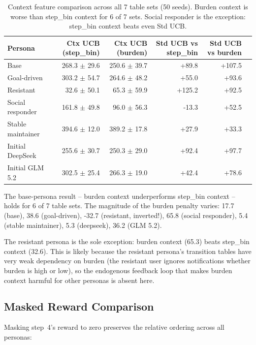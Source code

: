 \documentclass[11pt]{article}
\begin{document}
\begin{table}[h]
\centering
\begin{tabular}{lrrrrr}
\toprule
Persona & Ctx UCB (step\_bin) & Ctx UCB (burden) & Std UCB vs step\_bin & Std UCB vs burden \\
\midrule
Base & 268.3 $\pm$ 29.6 & 250.6 $\pm$ 39.7 & +89.8 & +107.5 \\
Goal-driven & 303.2 $\pm$ 54.7 & 264.6 $\pm$ 48.2 & +55.0 & +93.6 \\
Resistant & 32.6 $\pm$ 50.1 & 65.3 $\pm$ 59.9 & +125.2 & +92.5 \\
Social responder & 161.8 $\pm$ 49.8 & 96.0 $\pm$ 56.3 & -13.3 & +52.5 \\
Stable maintainer & 394.6 $\pm$ 12.0 & 389.2 $\pm$ 17.8 & +27.9 & +33.3 \\
Initial DeepSeek & 255.6 $\pm$ 30.7 & 250.3 $\pm$ 29.0 & +92.4 & +97.7 \\
Initial GLM 5.2 & 302.5 $\pm$ 25.4 & 266.3 $\pm$ 19.0 & +42.4 & +78.6 \\
\bottomrule
\end{tabular}
\caption{Context feature comparison across all 7 table sets (50 seeds). Burden context is worse than step\_bin context for 6 of 7 sets. Social responder is the exception: step\_bin context beats even Std UCB.}
\label{tab:cross_context}
\end{table}

The base-persona result -- burden context underperforms step\_bin context -- holds for 6 of 7 table sets. The magnitude of the burden penalty varies: 17.7 (base), 38.6 (goal-driven), -32.7 (resistant, inverted!), 65.8 (social responder), 5.4 (stable maintainer), 5.3 (deepseek), 36.2 (GLM 5.2).

The resistant persona is the sole exception: burden context (65.3) beats step\_bin context (32.6). This is likely because the resistant persona's transition tables have very weak dependency on burden (the resistant user ignores notifications whether burden is high or low), so the endogenous feedback loop that makes burden context harmful for other personas is absent here.

\subsection{Masked Reward Comparison}

Masking step~4's reward to zero preserves the relative ordering across all personas:
\end{document}
